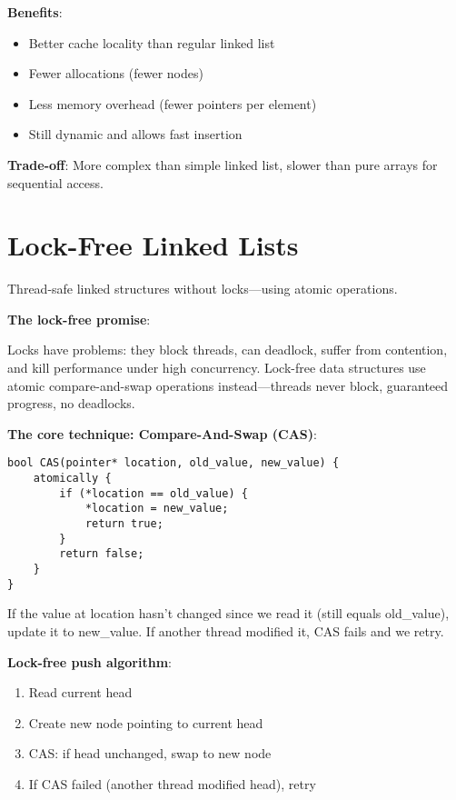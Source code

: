 \textbf{Benefits}:

\begin{itemize}
    \item Better cache locality than regular linked list
    \item Fewer allocations (fewer nodes)
    \item Less memory overhead (fewer pointers per element)
    \item Still dynamic and allows fast insertion
\end{itemize}

\textbf{Trade-off}: More complex than simple linked list, slower than pure arrays for sequential access.

\section{Lock-Free Linked Lists}

Thread-safe linked structures without locks---using atomic operations.

\textbf{The lock-free promise}:

Locks have problems: they block threads, can deadlock, suffer from contention, and kill performance under high concurrency. Lock-free data structures use atomic compare-and-swap operations instead---threads never block, guaranteed progress, no deadlocks.

\textbf{The core technique: Compare-And-Swap (CAS)}:

\begin{verbatim}
bool CAS(pointer* location, old_value, new_value) {
    atomically {
        if (*location == old_value) {
            *location = new_value;
            return true;
        }
        return false;
    }
}
\end{verbatim}

If the value at location hasn't changed since we read it (still equals old\_value), update it to new\_value. If another thread modified it, CAS fails and we retry.

\textbf{Lock-free push algorithm}:
\begin{enumerate}
    \item Read current head
    \item Create new node pointing to current head
    \item CAS: if head unchanged, swap to new node
    \item If CAS failed (another thread modified head), retry
\end{enumerate}

